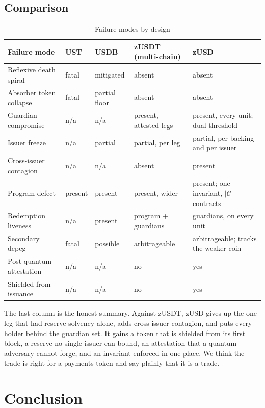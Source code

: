 \documentclass[11pt,a4paper]{article}
\begin{document}
\subsection{Comparison}

\begin{table}[t]
\centering
\caption{Failure modes by design}
\footnotesize
\setlength{\tabcolsep}{2.5pt}
\begin{tabular}{@{}lllll@{}}
\toprule
\textbf{Failure mode} & \textbf{UST} & \textbf{USDB} & \textbf{zUSDT (multi-chain)} & \textbf{zUSD} \\ \midrule
Reflexive death spiral & fatal & mitigated & absent & absent \\
Absorber token collapse & fatal & partial floor & absent & absent \\
Guardian compromise & n/a & n/a & present, attested legs & present, every unit; dual threshold \\
Issuer freeze & n/a & partial & partial, per leg & partial, per backing and per issuer \\
Cross-issuer contagion & n/a & n/a & absent & present \\
Program defect & present & present & present, wider & present; one invariant, $|\mathcal{C}|$ contracts \\
Redemption liveness & n/a & present & program + guardians & guardians, on every unit \\
Secondary depeg & fatal & possible & arbitrageable & arbitrageable; tracks the weaker coin \\
Post-quantum attestation & n/a & n/a & no & yes \\
Shielded from issuance & n/a & n/a & no & yes \\ \bottomrule
\end{tabular}
\end{table}

The last column is the honest summary. Against zUSDT, zUSD gives up the one leg that had reserve solvency alone, adds cross-issuer contagion, and puts every holder behind the guardian set. It gains a token that is shielded from its first block, a reserve no single issuer can bound, an attestation that a quantum adversary cannot forge, and an invariant enforced in one place. We think the trade is right for a payments token and say plainly that it is a trade.

\section{Conclusion}
\label{sec:conclusion}
\end{document}

